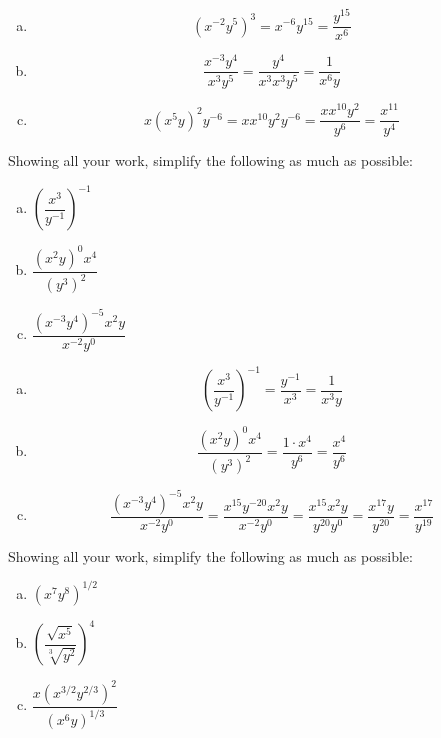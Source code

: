 \documentclass[11pt,letterpaper]{article}
\begin{document}
\sol
\begin{enumerate}[(a)]
\item 
	\[
	(x^{-2} y^5)^3= x^{-6} y^{15}= \dfrac{y^{15}}{x^6}
	\] \pspace

\item 
	\[
	\dfrac{x^{-3}y^4}{x^3y^5}= \dfrac{y^4}{x^3x^3y^5}= \dfrac{1}{x^6 y}
	\] \pspace

\item 
	\[
	x(x^5y)^2y^{-6}= x x^{10} y^2 y^{-6}= \dfrac{xx^{10}y^2}{y^6}= \dfrac{x^{11}}{y^4}
	\]
\end{enumerate}



\newpage



 Showing all your work, simplify the following as much as possible:
        \begin{enumerate}[(a)]
        \item $\left( \dfrac{x^3}{y^{-1}} \right)^{-1}$
        \item $\dfrac{(x^2y)^0 x^4}{(y^3)^2}$
        \item $\dfrac{(x^{-3} y^4)^{-5} x^2y}{x^{-2} y^0}$
        \end{enumerate} \pspace

\sol
\begin{enumerate}[(a)]
\item 
	\[
	\left( \dfrac{x^3}{y^{-1}} \right)^{-1}= \dfrac{y^{-1}}{x^3}= \dfrac{1}{x^3y}
	\] \pspace

\item 
	\[
	\dfrac{(x^2y)^0 x^4}{(y^3)^2}= \dfrac{1 \cdot x^4}{y^6}= \dfrac{x^4}{y^6}
	\] \pspace

\item 
	\[
	\dfrac{(x^{-3} y^4)^{-5} x^2y}{x^{-2} y^0}= \dfrac{x^{15} y^{-20} x^2 y}{x^{-2} y^0}= \dfrac{x^{15} x^2 y}{y^{20} y^0}= \dfrac{x^{17}y}{y^{20}}= \dfrac{x^{17}}{y^{19}}
	\]
\end{enumerate}



\newpage



 Showing all your work, simplify the following as much as possible:
        \begin{enumerate}[(a)]
        \item $(x^7 y^8)^{1/2}$
        \item $\left( \dfrac{\sqrt{x^5}}{\sqrt[3]{y^2}} \right)^4$
        \item $\dfrac{x(x^{3/2}y^{2/3})^2}{(x^6 y)^{1/3}}$
        \end{enumerate} \pspace
\end{document}
